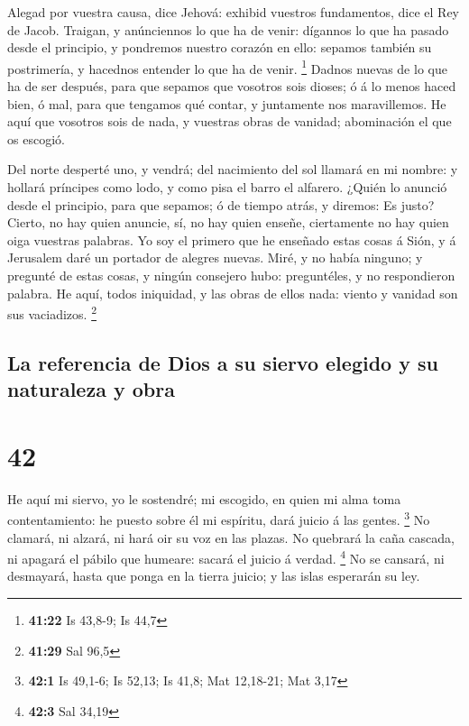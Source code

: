  Alegad por vuestra causa, dice Jehová: exhibid vuestros
fundamentos, dice el Rey de Jacob.  Traigan, y anúnciennos
lo que ha de venir: dígannos lo que ha pasado desde el principio, y
pondremos nuestro corazón en ello: sepamos también su postrimería, y
hacednos entender lo que ha de venir. \footnote{\textbf{41:22} Is
  43,8-9; Is 44,7}  Dadnos nuevas de lo que ha de ser
después, para que sepamos que vosotros sois dioses; ó á lo menos haced
bien, ó mal, para que tengamos qué contar, y juntamente nos
maravillemos.  He aquí que vosotros sois de nada, y
vuestras obras de vanidad; abominación el que os escogió.

 Del norte desperté uno, y vendrá; del nacimiento del sol
llamará en mi nombre: y hollará príncipes como lodo, y como pisa el
barro el alfarero.  ¿Quién lo anunció desde el principio,
para que sepamos; ó de tiempo atrás, y diremos: Es justo? Cierto, no hay
quien anuncie, sí, no hay quien enseñe, ciertamente no hay quien oiga
vuestras palabras.  Yo soy el primero que he enseñado estas
cosas á Sión, y á Jerusalem daré un portador de alegres nuevas.
 Miré, y no había ninguno; y pregunté de estas cosas, y
ningún consejero hubo: preguntéles, y no respondieron palabra.
 He aquí, todos iniquidad, y las obras de ellos nada:
viento y vanidad son sus vaciadizos. \footnote{\textbf{41:29} Sal 96,5}

\hypertarget{la-referencia-de-dios-a-su-siervo-elegido-y-su-naturaleza-y-obra}{%
\subsection{La referencia de Dios a su siervo elegido y su naturaleza y
obra}\label{la-referencia-de-dios-a-su-siervo-elegido-y-su-naturaleza-y-obra}}

\hypertarget{section-41}{%
\section{42}\label{section-41}}

 He aquí mi siervo, yo le sostendré; mi escogido, en quien
mi alma toma contentamiento: he puesto sobre él mi espíritu, dará juicio
á las gentes. \footnote{\textbf{42:1} Is 49,1-6; Is 52,13; Is 41,8; Mat
  12,18-21; Mat 3,17}  No clamará, ni alzará, ni hará oir su
voz en las plazas.  No quebrará la caña cascada, ni apagará
el pábilo que humeare: sacará el juicio á verdad. \footnote{\textbf{42:3}
  Sal 34,19}  No se cansará, ni desmayará, hasta que ponga
en la tierra juicio; y las islas esperarán su ley.


